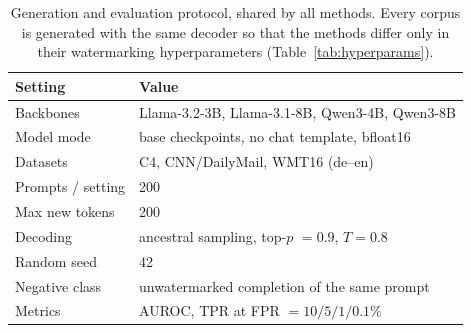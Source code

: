 %

\begin{table}[t]
\centering
\caption{Generation and evaluation protocol, shared by all methods. Every
corpus is generated with the same decoder so that the methods differ only in
their watermarking hyperparameters (Table~\ref{tab:hyperparams}).}
\label{tab:protocol}
\small
\begin{tabular}{@{}ll@{}}
\toprule
Setting & Value \\
\midrule
Backbones      & Llama-3.2-3B, Llama-3.1-8B, Qwen3-4B, Qwen3-8B \\
Model mode     & base checkpoints, no chat template, bfloat16 \\
Datasets       & C4, CNN/DailyMail, WMT16 (de--en) \\
Prompts / setting & 200 \\
Max new tokens & 200 \\
Decoding       & ancestral sampling, top-$p$ $=0.9$, $T=0.8$ \\
Random seed    & 42 \\
Negative class & unwatermarked completion of the same prompt \\
Metrics        & AUROC, TPR at FPR $=10/5/1/0.1\%$ \\
\bottomrule
\end{tabular}
\end{table}

